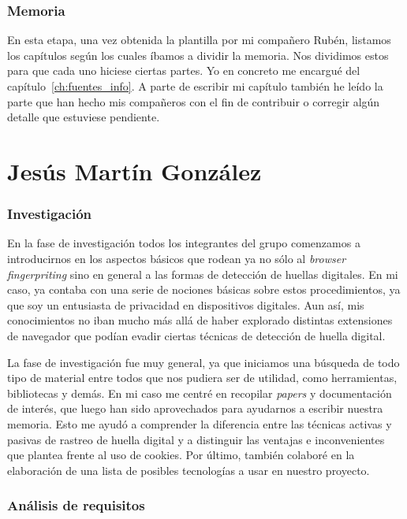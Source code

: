 \subsubsection{Memoria}
En esta etapa, una vez obtenida la plantilla por mi compañero Rubén, listamos los capítulos según los cuales íbamos a dividir la memoria. Nos dividimos estos para que cada uno hiciese ciertas partes. Yo en concreto me encargué del capítulo~\ref{ch:fuentes_info}. A parte de escribir mi capítulo también he leído la parte que han hecho mis compañeros con el fin de contribuir o corregir algún detalle que estuviese pendiente.


\section{Jesús Martín González}
\subsubsection{Investigación}
En la fase de investigación todos los integrantes del grupo comenzamos a introducirnos en los aspectos básicos que rodean ya no sólo al \textit{browser fingerpriting} sino en general a las formas de detección de huellas digitales. En mi caso, ya contaba con una serie de nociones básicas sobre estos procedimientos, ya que soy un entusiasta de privacidad en dispositivos digitales. Aun así, mis conocimientos no iban mucho más allá de haber explorado distintas extensiones de navegador que podían evadir ciertas técnicas de detección de huella digital. \par

La fase de investigación fue muy general, ya que iniciamos una búsqueda de todo tipo de material entre todos que nos pudiera ser de utilidad, como herramientas, bibliotecas y demás. En mi caso me centré en recopilar \textit{papers} y documentación de interés, que luego han sido aprovechados para ayudarnos a escribir nuestra memoria. Esto me ayudó a comprender la diferencia entre las técnicas activas y pasivas de rastreo de huella digital y a distinguir las ventajas e inconvenientes que plantea frente al uso de cookies. Por último, también colaboré en la elaboración de una lista de posibles tecnologías a usar en nuestro proyecto. \par

\subsubsection{Análisis de requisitos}

